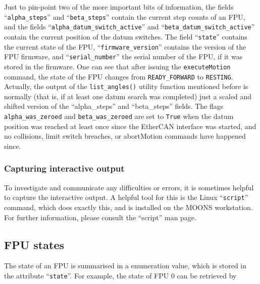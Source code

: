 \documentclass[11pt,a4paper]{report}
\begin{document}
\begin{sloppypar}
Just to pin-point two of the more important bits of information, the
fields ``\texttt{alpha\_steps}'' and ``\texttt{beta\_steps}'' contain
the current step counts of an FPU, and the fields
``\texttt{alpha\_datum\_switch\_active}'' and
``\texttt{beta\_datum\_switch\_active}'' contain the current position
of the datum switches. The field ``\texttt{state}'' contains the
current state of the FPU, ``\texttt{firmware\_version}'' contains the
version of the FPU firmware, and ``\texttt{serial\_number}'' the
serial number of the FPU, if it was stored in the firmware. One can
see that after issuing the \texttt{executeMotion} command, the state
of the FPU changes from \texttt{READY\_FORWARD} to
\texttt{RESTING}. Actually, the output of the \texttt{list\_angles()}
utility function mentioned before is normally (that is, if at least
one datum search was completed) just a scaled and shifted version of
the ``alpha\_steps'' and ``beta\_steps'' fields. The flags
\texttt{alpha\_was\_zeroed} and \texttt{beta\_was\_zeroed} are set to
\texttt{True} when the datum position was reached at least once since
the EtherCAN interface was started, and no collisions, limit switch breaches, or
abortMotion commands have happened since.
\end{sloppypar}

\subsubsection*{Capturing interactive output}
  To
investigate and communicate any difficulties or errors, it is
sometimes helpful to capture the interactive output. A helpful tool
for this is the Linux ``\texttt{script}'' command, which does exactly
this, and is installed on the MOONS workstation.  For further
information, please consult the ``script'' man page.



\subsection{FPU states}
  
 
 The state of an
FPU is summarised in a enumeration value, which is stored in the
attribute ``\texttt{state}''. For example, the state of FPU 0 can be
retrieved by
\end{document}
